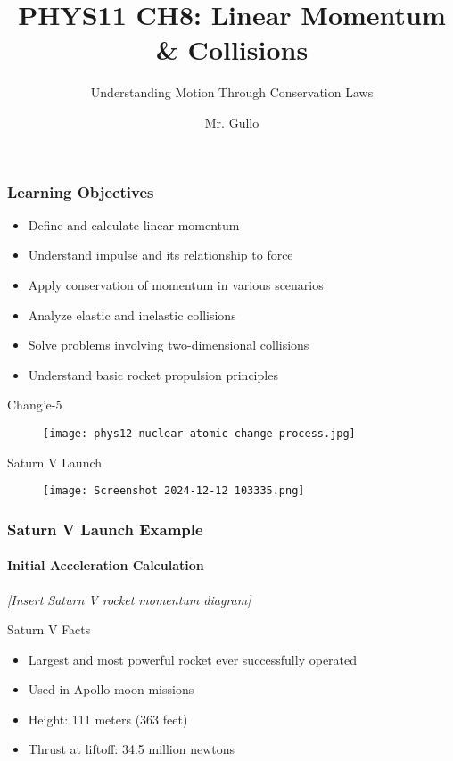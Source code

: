 \documentclass{beamer}
\title[Linear Momentum]{PHYS11 CH8: Linear Momentum \& Collisions}
\subtitle{Understanding Motion Through Conservation Laws}
\author[Mr. Gullo]{Mr. Gullo}
\date[]{}
\begin{document}
\frame{\titlepage}

\begin{frame}
\frametitle{Learning Objectives}
\begin{itemize}
\item Define and calculate linear momentum
\item Understand impulse and its relationship to force
\item Apply conservation of momentum in various scenarios
\item Analyze elastic and inelastic collisions
\item Solve problems involving two-dimensional collisions
\item Understand basic rocket propulsion principles
\end{itemize}
\end{frame}
\begin{frame}{Chang’e-5 }
    \begin{figure}
        \centering
        \texttt{[image: phys12-nuclear-atomic-change-process.jpg]}
    \end{figure}
\end{frame}

\begin{frame}{Saturn V Launch}
   \begin{figure}
       \centering
       \texttt{[image: Screenshot 2024-12-12 103335.png]}
   \end{figure}
\end{frame}

\begin{frame}
\frametitle{Saturn V Launch Example}
\framesubtitle{Initial Acceleration Calculation}

\begin{center}
\textit{[Insert Saturn V rocket momentum diagram]}
\end{center}

\begin{block}{Saturn V Facts}
\begin{itemize}
\item Largest and most powerful rocket ever successfully operated
\item Used in Apollo moon missions
\item Height: 111 meters (363 feet)
\item Thrust at liftoff: 34.5 million newtons
\end{itemize}
\end{block}
\end{frame}
\end{document}
